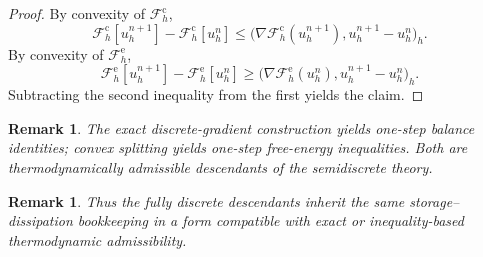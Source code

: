 \documentclass[11pt]{article}
\newtheorem{remark}[theorem]{Remark}
\newcommand{\F}{\mathcal{F}}
\begin{document}
\begin{proof}
By convexity of \(\F_h^{\mathrm{c}}\),
\[
\F_h^{\mathrm{c}}[u_h^{n+1}] - \F_h^{\mathrm{c}}[u_h^n]
\le
\bigl(\nabla \F_h^{\mathrm{c}}(u_h^{n+1}),u_h^{n+1}-u_h^n\bigr)_h.
\]
By convexity of \(\F_h^{\mathrm{e}}\),
\[
\F_h^{\mathrm{e}}[u_h^{n+1}] - \F_h^{\mathrm{e}}[u_h^n]
\ge
\bigl(\nabla \F_h^{\mathrm{e}}(u_h^n),u_h^{n+1}-u_h^n\bigr)_h.
\]
Subtracting the second inequality from the first yields the claim.
\end{proof}

\begin{remark}
The exact discrete-gradient construction yields one-step balance identities; convex
splitting yields one-step free-energy inequalities. Both are thermodynamically
admissible descendants of the semidiscrete theory.
\end{remark}

\begin{remark}
Thus the fully discrete descendants inherit the same storage--dissipation bookkeeping
in a form compatible with exact or inequality-based thermodynamic admissibility.
\end{remark}
\end{document}
